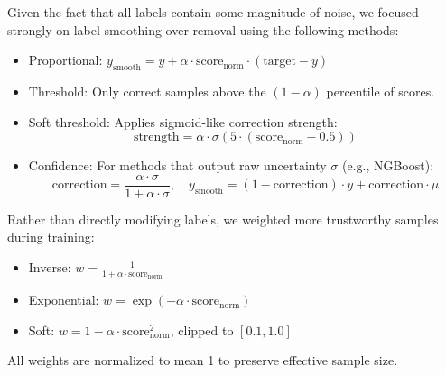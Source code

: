 Given the fact that all labels contain some magnitude of noise, we focused strongly on label smoothing over removal using the following methods:

\begin{itemize}
    \item Proportional: $y_{\text{smooth}} = y + \alpha \cdot \text{score}_{\text{norm}} \cdot (\text{target} - y)$
    
    \item Threshold: Only correct samples above the $(1-\alpha)$ percentile of scores.
    
    \item Soft threshold: Applies sigmoid-like correction strength:
    $$\text{strength} = \alpha \cdot \sigma\left(5 \cdot (\text{score}_{\text{norm}} - 0.5)\right)$$
    
    \item Confidence: For methods that output raw uncertainty $\sigma$ (e.g., NGBoost):
    $$\text{correction} = \frac{\alpha \cdot \sigma}{1 + \alpha \cdot \sigma}, \quad y_{\text{smooth}} = (1 - \text{correction}) \cdot y + \text{correction} \cdot \mu$$
\end{itemize}


Rather than directly modifying labels, we weighted more trustworthy samples during training:

\begin{itemize}
    \item Inverse: $w = \frac{1}{1 + \alpha \cdot \text{score}_{\text{norm}}}$
    
    \item Exponential: $w = \exp(-\alpha \cdot \text{score}_{\text{norm}})$
    
    \item Soft: $w = 1 - \alpha \cdot \text{score}_{\text{norm}}^2$, clipped to $[0.1, 1.0]$
\end{itemize}

All weights are normalized to mean 1 to preserve effective sample size.

